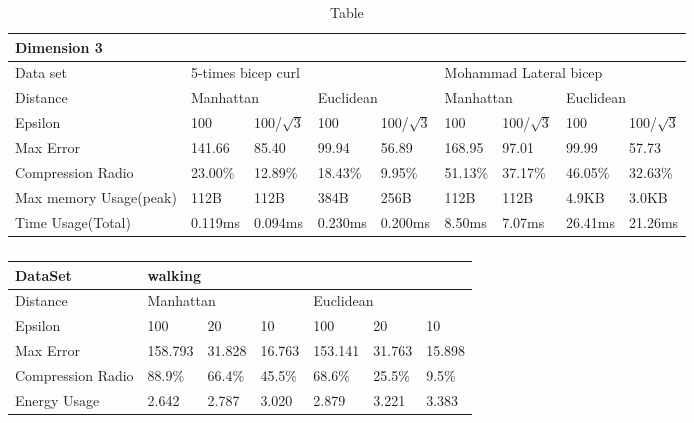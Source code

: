 \documentclass[10pt, conference, compsocconf]{IEEEtran}
\begin{document}
\begin{table*}[]
    \caption{Table}
    \begin{tabular}{|l|l|l|l|l|l|l|l|l|}
    \hline
    \multicolumn{9}{|l|}{Dimension 3}                                                                                                                         \\ \hline
    Data set               & \multicolumn{4}{l|}{5-times bicep curl}                        & \multicolumn{4}{l|}{Mohammad Lateral bicep}                     \\ \hline
    Distance               & \multicolumn{2}{l|}{Manhattan} & \multicolumn{2}{l|}{Euclidean} & \multicolumn{2}{l|}{Manhattan} & \multicolumn{2}{l|}{Euclidean} \\ \hline
    Epsilon                & 100          & 100/$\sqrt{3}$  & 100         & 100/$\sqrt{3}$  & 100        & 100/$\sqrt{3}$    & 100        & 100/$\sqrt{3}$    \\ \hline
    Max Error              & 141.66       & 85.40           & 99.94       & 56.89           & 168.95     & 97.01             & 99.99      & 57.73             \\ \hline
    Compression Radio      & 23.00\%      & 12.89\%         & 18.43\%     & 9.95\%          & 51.13\%    & 37.17\%           & 46.05\%    & 32.63\%           \\ \hline
    Max memory Usage(peak) & 112B         & 112B            & 384B        & 256B            & 112B       & 112B              & 4.9KB      & 3.0KB             \\ \hline
    Time Usage(Total)      & 0.119ms      & 0.094ms         & 0.230ms     & 0.200ms         & 8.50ms     & 7.07ms            & 26.41ms    & 21.26ms           \\ \hline
    \end{tabular}
\end{table*}

\begin{table}[]
    \caption{}
    \begin{tabular}{|l|l|l|l|l|l|l|}
    \hline
    DataSet           & \multicolumn{6}{l|}{walking}                                   \\\hline
    Distance          & \multicolumn{3}{l|}{Manhattan} & \multicolumn{3}{l|}{Euclidean} \\\hline
    Epsilon           & 100       & 20      & 10      & 100       & 20      & 10      \\\hline
    Max Error         & 158.793   & 31.828  & 16.763  & 153.141   & 31.763  & 15.898  \\\hline
    Compression Radio & 88.9\%    & 66.4\%  & 45.5\%  & 68.6\%    & 25.5\%  & 9.5\%   \\\hline
    Energy Usage      & 2.642     & 2.787   & 3.020   & 2.879     & 3.221   & 3.383   \\\hline
    \end{tabular}
\end{table}
\end{document}
